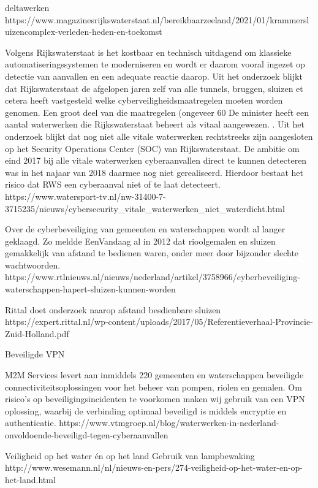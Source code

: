 deltawerken
https://www.magazinesrijkswaterstaat.nl/bereikbaarzeeland/2021/01/krammersluizencomplex-verleden-heden-en-toekomst


Volgens Rijkswaterstaat is het kostbaar en technisch uitdagend om klassieke automatiseringssystemen te moderniseren en wordt er daarom vooral ingezet op detectie van aanvallen en een adequate reactie daarop.
Uit het onderzoek blijkt dat Rijkswaterstaat de afgelopen jaren zelf van alle tunnels, bruggen, sluizen et cetera heeft vastgesteld welke cyberveiligheidsmaatregelen moeten worden genomen. Een groot deel van die maatregelen (ongeveer 60%
De minister heeft een aantal waterwerken die Rijkswaterstaat beheert als vitaal aangewezen. . Uit het onderzoek blijkt dat nog niet alle vitale waterwerken rechtstreeks zijn aangesloten op het Security Operations Center (SOC) van Rijkswaterstaat. De ambitie om eind 2017 bij alle vitale waterwerken cyberaanvallen direct te kunnen detecteren was in het najaar van 2018 daarmee nog niet gerealiseerd. Hierdoor bestaat het risico dat RWS een cyberaanval niet of te laat detecteert.
https://www.watersport-tv.nl/nw-31400-7-3715235/nieuws/cybersecurity_vitale_waterwerken_niet_waterdicht.html


Over de cyberbeveiliging van gemeenten en waterschappen wordt al langer geklaagd. Zo meldde EenVandaag al in 2012 dat rioolgemalen en sluizen gemakkelijk van afstand te bedienen waren, onder meer door bijzonder slechte wachtwoorden.
https://www.rtlnieuws.nl/nieuws/nederland/artikel/3758966/cyberbeveiliging-waterschappen-hapert-sluizen-kunnen-worden

Rittal doet onderzoek naarop afstand besdienbare sluizen
https://expert.rittal.nl/wp-content/uploads/2017/05/Referentieverhaal-Provincie-Zuid-Holland.pdf



Beveiligde VPN

M2M Services levert aan inmiddels 220 gemeenten en waterschappen beveiligde connectiviteitsoplossingen voor het beheer van pompen, riolen en gemalen. Om risico’s op beveiligingsincidenten te voorkomen maken wij gebruik van een VPN oplossing, waarbij de verbinding optimaal beveiligd is middels encryptie en authenticatie.
https://www.vtmgroep.nl/blog/waterwerken-in-nederland-onvoldoende-beveiligd-tegen-cyberaanvallen

Veiligheid op het water én op het land
Gebruik van lampbewaking 
http://www.wesemann.nl/nl/nieuws-en-pers/274-veiligheid-op-het-water-en-op-het-land.html



